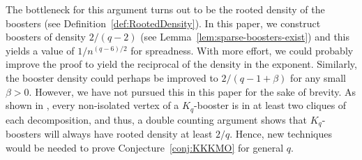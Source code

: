 \documentclass[11pt]{article}
\numberwithin{equation}{section}
\newcounter{i}
\theoremstyle{plain}
\theoremstyle{plain} %
\theoremstyle{definition}
\newcommand{\cH}{\mathcal{H}}
\def\COMMENT#1{}
\begin{document}


The bottleneck for this argument turns out to be the rooted density of the boosters (see Definition~\ref{def:RootedDensity}). In this paper, we construct boosters of density $2/(q - 2)$ (see Lemma~\ref{lem:sparse-boosters-exist}) and this yields a value of $1/n^{(q-6)/2}$ for spreadness. With more effort, we could probably improve the proof to yield the reciprocal of the density in the exponent. Similarly, the booster density could perhaps be improved to $2/(q-1+\beta)$ for any small $\beta > 0$. 
 However, we have not pursued this in this paper for the sake of brevity.  As shown in \cite[Lemma 10.1]{DKPIII}, every non-isolated vertex of a $K_q$-booster is in  at least two cliques of each decomposition, and thus, a double counting argument shows that $K_q$-boosters will always have rooted density at least $2/q$.\COMMENT{
    Let $B$ be a $K_q$-booster with decompositions $\cH$ and $\cH'$.  We may assume the rooted booster is obtained from $B$ by rooting on some clique in $\cH$. We may also assume without loss of generality that $B$ has no isolated vertices. Hence every vertex is in at least two cliques of each decomposition.
Thus by hypergraph handshaking, 
    \begin{equation*}
        2|V(B)| \geq \sum_{v \in V(B) }\text{\# cliques in $\cH$ containing v} = q|\cH|.
    \end{equation*}
    Hence the rooted density is at least
    \begin{equation*}
        \frac{|\cH| - 1}{|V(B)| - q} \geq \frac{2|V(B)|/q - 1}{|V(B)| - 1} = \frac{2/q - 1/|V(B)|}{1 - 1/|V(B)|}.
    \end{equation*}
    The right side of the inequality above is decreasing in $|V(B)|$ with a limit of $2 / q$, as desired.
 } Hence, new techniques would be needed to prove Conjecture~\ref{conj:KKKMO} for general $q$. 
\end{document}
